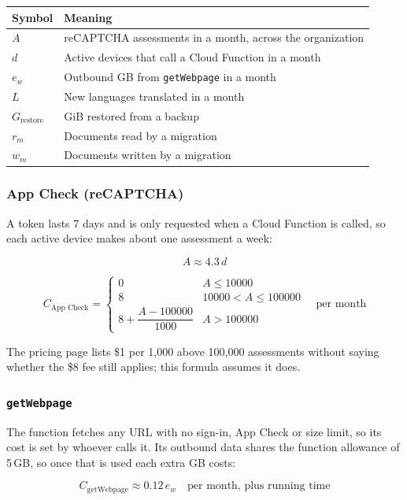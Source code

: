 \documentclass{article}
\begin{document}
\begin{center}
\begin{tabular}{ll}
\toprule
Symbol & Meaning \\
\midrule
$A$ & reCAPTCHA assessments in a month, across the organization \\
$d$ & Active devices that call a Cloud Function in a month \\
$e_w$ & Outbound GB from \texttt{getWebpage} in a month \\
$L$ & New languages translated in a month \\
$G_{\text{restore}}$ & GiB restored from a backup \\
$r_m$ & Documents read by a migration \\
$w_m$ & Documents written by a migration \\
\bottomrule
\end{tabular}
\end{center}

\subsubsection{App Check (reCAPTCHA)}

A token lasts 7 days and is only requested when a Cloud Function is called,
so each active device makes about one assessment a week:

\[
A \approx 4.3\,d
\]

\[
C_{\text{App Check}} =
\begin{cases}
0 & A \le 10000 \\
8 & 10000 < A \le 100000 \\
8 + \dfrac{A - 100000}{1000} & A > 100000
\end{cases}
\quad \text{per month}
\]

The pricing page lists \$1 per 1{,}000 above 100{,}000 assessments without
saying whether the \$8 fee still applies; this formula assumes it does.

\subsubsection{\texttt{getWebpage}}

The function fetches any URL with no sign-in, App Check or size limit, so its
cost is set by whoever calls it. Its outbound data shares the function
allowance of 5\,GB, so once that is used each extra GB costs:

\[
C_{\text{getWebpage}} \approx 0.12\,e_w
\quad \text{per month, plus running time}
\]
\end{document}
